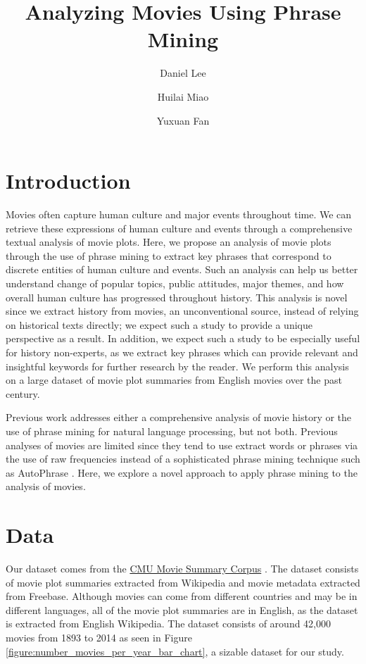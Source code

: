 \documentclass[hidelinks]{article}
\title{Analyzing Movies Using Phrase Mining}
\author{Daniel Lee \and Huilai Miao \and Yuxuan Fan}
\begin{document}
\maketitle

\begin{abstract}
\end{abstract}

\begin{multicols}{2}
\section{Introduction}
Movies often capture human culture and major events throughout time. We can retrieve these expressions of human culture and events through a comprehensive textual analysis of movie plots. Here, we propose an analysis of movie plots through the use of phrase mining to extract key phrases that correspond to discrete entities of human culture and events. Such an analysis can help us better understand change of popular topics, public attitudes, major themes, and how overall human culture has progressed throughout history. This analysis is novel since we extract history from movies, an unconventional source, instead of relying on historical texts directly; we expect such a study to provide a unique perspective as a result. In addition, we expect such a study to be especially useful for history non-experts, as we extract key phrases which can provide relevant and insightful keywords for further research by the reader. We perform this analysis on a large dataset of movie plot summaries from English movies over the past century.

Previous work addresses either a comprehensive analysis of movie history or the use of phrase mining for natural language processing, but not both. Previous analyses of movies are limited since they tend to use extract words or phrases via the use of raw frequencies instead of a sophisticated phrase mining technique such as AutoPhrase \cite{DBLP:journals/corr/ShangLJRVH17}. Here, we explore a novel approach to apply phrase mining to the analysis of movies.

\section{Data}
Our dataset comes from the \href{http://www.cs.cmu.edu/~ark/personas/}{CMU Movie Summary Corpus} \cite{Bamman2013LearningLP}. The dataset consists of movie plot summaries extracted from Wikipedia and movie metadata extracted from Freebase. Although movies can come from different countries and may be in different languages, all of the movie plot summaries are in English, as the dataset is extracted from English Wikipedia. The dataset consists of around 42,000 movies from 1893 to 2014 as seen in Figure \ref{figure:number_movies_per_year_bar_chart}, a sizable dataset for our study.


\end{multicols}
\end{document}
